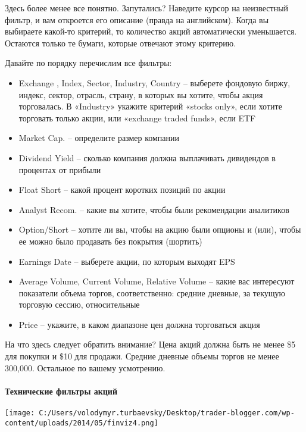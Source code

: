 \documentclass[a5paper]{article}
\begin{document}
Здесь более менее все понятно. Запутались? Наведите курсор на неизвестный фильтр, и вам откроется его описание (правда на английском). Когда вы выбираете какой-то критерий, то количество акций автоматически уменьшается. Остаются только те бумаги, которые отвечают этому критерию.

Давайте по порядку перечислим все фильтры:
\begin{itemize}
\item     Exchange , Index, Sector, Industry, Country – выберете фондовую биржу, индекс, сектор, отрасль, страну, в которых вы хотите, чтобы акция торговалась. В «Industry» укажите критерий «stocks only», если хотите торговать только акции, или «exchange traded funds», если ETF
\item     Market Cap. – определите размер компании
\item     Dividend Yield – сколько компания должна выплачивать дивидендов в процентах от прибыли
\item     Float Short – какой процент коротких позиций по акции
\item     Analyst Recom. – какие вы хотите, чтобы были рекомендации аналитиков
\item     Option/Short – хотите ли вы, чтобы на акцию были опционы и (или), чтобы ее можно было продавать без покрытия (шортить)
\item     Earnings Date – выберете акции, по которым выходят EPS
\item     Average Volume, Current Volume, Relative Volume – какие вас интересуют показатели объема торгов, соответственно: средние дневные, за текущую торговую сессию, относительные
\item     Price – укажите, в каком диапазоне цен должна торговаться акция
\end{itemize}

На что здесь следует обратить внимание? Цена акций должна быть не
менее \$5 для покупки и \$10 для продажи. Средние дневные объемы торгов
не менее 300,000. Остальное по вашему усмотрению.

\paragraph{Технические фильтры акций}

\texttt{[image: C:/Users/volodymyr.turbaevsky/Desktop/trader-blogger.com/wp-content/uploads/2014/05/finviz4.png]}
\end{document}
